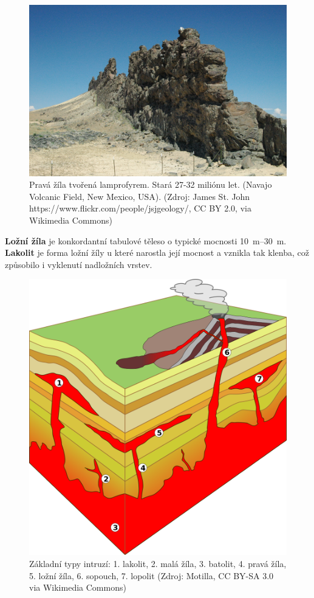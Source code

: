\begin{figure}[h]
	\centering
	\includegraphics[width=1\linewidth]{obrazky/sopky/zila}
	\caption{Pravá žíla tvořená lamprofyrem. Stará 27-32 miliónu let. (Navajo Volcanic Field, New Mexico, USA). (Zdroj: James St. John https://www.flickr.com/people/jsjgeology/, CC BY 2.0, via Wikimedia Commons)}
	\label{fig:zila}
\end{figure}


\textbf{Ložní žíla} je konkordantní tabulové těleso o typické mocnosti \SIrange{10}{30}{\metre}. \textbf{Lakolit} je forma ložní žíly u které narostla její mocnost a vznikla tak klenba, což způsobilo i vyklenutí nadložních vrstev.

\begin{figure}[h]
	\includegraphics[width=\linewidth]{obrazky/sopky/Intrusion_types}
	\caption{Základní typy intruzí: 1. lakolit, 2. malá žíla, 3. batolit, 4. pravá žíla, 5. ložní žíla, 6. sopouch, 7. lopolit (Zdroj: Motilla, CC BY-SA 3.0 via Wikimedia Commons)}
	\label{fig:intrusion}
\end{figure}

